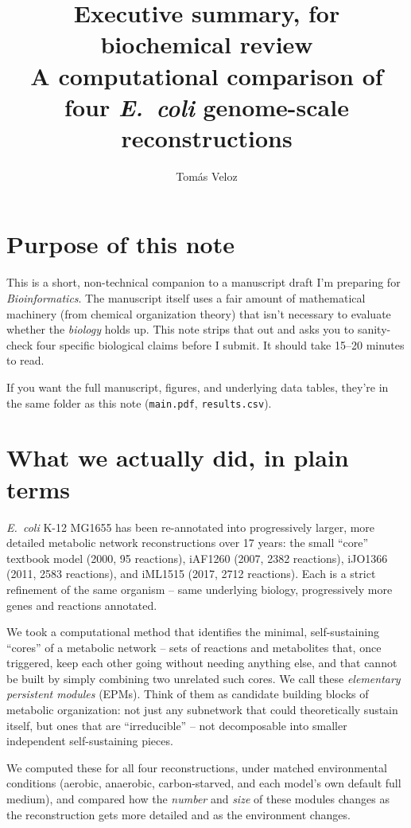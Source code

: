 \documentclass[11pt]{article}
\title{\vspace{-1.5em}Executive summary, for biochemical review\\
\large A computational comparison of four \textit{E.\ coli} genome-scale reconstructions}
\author{Tom\'as Veloz}
\date{}
\begin{document}
\maketitle
\vspace{-2em}

\section*{Purpose of this note}
This is a short, non-technical companion to a manuscript draft I'm preparing for \textit{Bioinformatics}. The manuscript itself uses a fair amount of mathematical machinery (from chemical organization theory) that isn't necessary to evaluate whether the \emph{biology} holds up. This note strips that out and asks you to sanity-check four specific biological claims before I submit. It should take 15--20 minutes to read.

If you want the full manuscript, figures, and underlying data tables, they're in the same folder as this note (\texttt{main.pdf}, \texttt{results.csv}).

\section*{What we actually did, in plain terms}
\textit{E.\ coli} K-12 MG1655 has been re-annotated into progressively larger, more detailed metabolic network reconstructions over 17 years: the small ``core'' textbook model (2000, 95 reactions), iAF1260 (2007, 2382 reactions), iJO1366 (2011, 2583 reactions), and iML1515 (2017, 2712 reactions). Each is a strict refinement of the same organism -- same underlying biology, progressively more genes and reactions annotated.

We took a computational method that identifies the minimal, self-sustaining ``cores'' of a metabolic network -- sets of reactions and metabolites that, once triggered, keep each other going without needing anything else, and that cannot be built by simply combining two unrelated such cores. We call these \emph{elementary persistent modules} (EPMs). Think of them as candidate building blocks of metabolic organization: not just any subnetwork that could theoretically sustain itself, but ones that are ``irreducible'' -- not decomposable into smaller independent self-sustaining pieces.

We computed these for all four reconstructions, under matched environmental conditions (aerobic, anaerobic, carbon-starved, and each model's own default full medium), and compared how the \emph{number} and \emph{size} of these modules changes as the reconstruction gets more detailed and as the environment changes.
\end{document}
